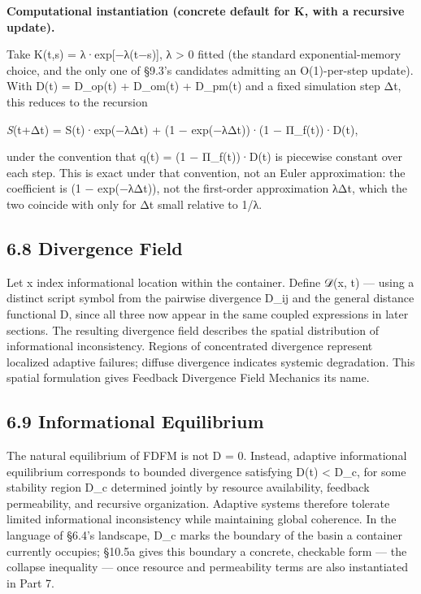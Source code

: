 \documentclass[
]{article}
\begin{document}
\textbf{Computational instantiation (concrete default for K, with a
recursive update).}

Take K(t,s) = λ·exp{[}−λ(t−s){]}, λ \textgreater{} 0 fitted (the
standard exponential-memory choice, and the only one of §9.3's
candidates admitting an O(1)-per-step update). With D(t) = D\_op(t) +
D\_om(t) + D\_pm(t) and a fixed simulation step Δt, this reduces to the
recursion

\emph{S}(t+Δt) = S(t)·exp(−λΔt) + (1 − exp(−λΔt))·(1 − Π\_f(t))·D(t),

under the convention that q(t) = (1 − Π\_f(t))·D(t) is piecewise
constant over each step. This is exact under that convention, not an
Euler approximation: the coefficient is (1 − exp(−λΔt)), not the
first-order approximation λΔt, which the two coincide with only for Δt
small relative to 1/λ.

\hypertarget{divergence-field}{%
\subsection{6.8 Divergence Field}\label{divergence-field}}

Let x index informational location within the container. Define 𝒟(x, t)
--- using a distinct script symbol from the pairwise divergence D\_ij
and the general distance functional D, since all three now appear in the
same coupled expressions in later sections. The resulting divergence
field describes the spatial distribution of informational inconsistency.
Regions of concentrated divergence represent localized adaptive
failures; diffuse divergence indicates systemic degradation. This
spatial formulation gives Feedback Divergence Field Mechanics its name.

\hypertarget{informational-equilibrium}{%
\subsection{6.9 Informational
Equilibrium}\label{informational-equilibrium}}

The natural equilibrium of FDFM is not D = 0. Instead, adaptive
informational equilibrium corresponds to bounded divergence satisfying
D(t) \textless{} D\_c, for some stability region D\_c determined jointly
by resource availability, feedback permeability, and recursive
organization. Adaptive systems therefore tolerate limited informational
inconsistency while maintaining global coherence. In the language of
§6.4's landscape, D\_c marks the boundary of the basin a container
currently occupies; §10.5a gives this boundary a concrete, checkable
form --- the collapse inequality --- once resource and permeability
terms are also instantiated in Part 7.
\end{document}
